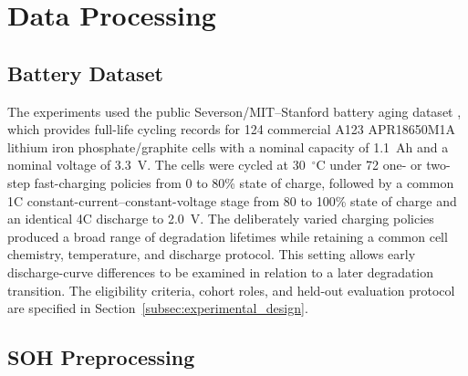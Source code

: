 \documentclass[pdflatex,sn-mathphys-num]{sn-jnl}
\begin{document}

\section{Data Processing}\label{sec:data_features}

\subsection{Battery Dataset}\label{subsec:dataset}

The experiments used the public Severson/MIT--Stanford battery aging dataset \cite{severson2019data}, which provides full-life cycling records for 124 commercial A123 APR18650M1A lithium iron phosphate/graphite cells with a nominal capacity of 1.1~Ah and a nominal voltage of 3.3~V. The cells were cycled at 30~$^{\circ}$C under 72 one- or two-step fast-charging policies from 0 to 80\% state of charge, followed by a common 1C constant-current--constant-voltage stage from 80 to 100\% state of charge and an identical 4C discharge to 2.0~V. The deliberately varied charging policies produced a broad range of degradation lifetimes while retaining a common cell chemistry, temperature, and discharge protocol. This setting allows early discharge-curve differences to be examined in relation to a later degradation transition. The eligibility criteria, cohort roles, and held-out evaluation protocol are specified in Section~\ref{subsec:experimental_design}.

\subsection{SOH Preprocessing}\label{subsec:soh_preprocessing}
\end{document}
